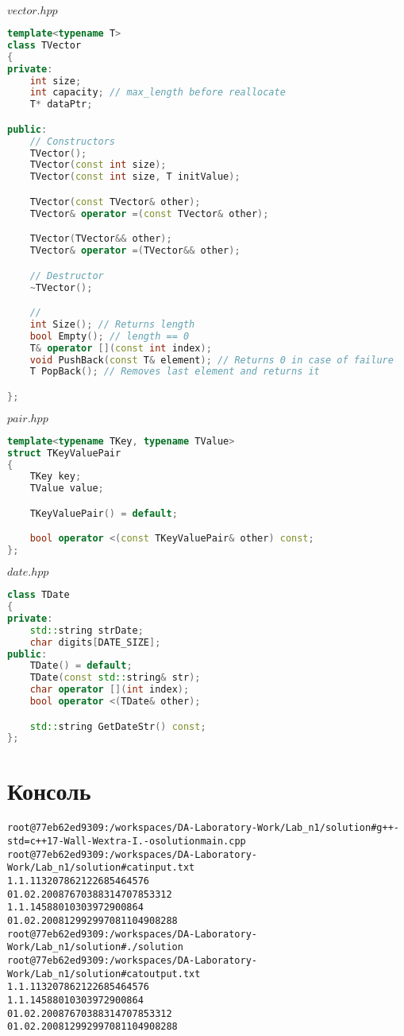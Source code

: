 $vector.hpp$
\begin{lstlisting}[language=c++]
template<typename T>
class TVector
{
private:
	int size;
	int capacity; // max_length before reallocate
	T* dataPtr;

public:
	// Constructors
	TVector();
	TVector(const int size);
	TVector(const int size, T initValue);

	TVector(const TVector& other);
	TVector& operator =(const TVector& other);

	TVector(TVector&& other);
	TVector& operator =(TVector&& other);

	// Destructor
	~TVector();

	// 
	int Size(); // Returns length
	bool Empty(); // length == 0
	T& operator [](const int index);
	void PushBack(const T& element); // Returns 0 in case of failure
	T PopBack(); // Removes last element and returns it

};
\end{lstlisting}

$pair.hpp$
\begin{lstlisting}[language=c++]
template<typename TKey, typename TValue>
struct TKeyValuePair
{
	TKey key;
	TValue value;

	TKeyValuePair() = default;

	bool operator <(const TKeyValuePair& other) const;
};
\end{lstlisting}

$date.hpp$
\begin{lstlisting}[language=c++]
class TDate
{
private:
	std::string strDate;
	char digits[DATE_SIZE];
public:
	TDate() = default;
	TDate(const std::string& str);
	char operator [](int index);
	bool operator <(TDate& other);

	std::string GetDateStr() const;
};
\end{lstlisting}

\pagebreak

\section{Консоль}
\begin{alltt}
root@77eb62ed9309:/workspaces/DA-Laboratory-Work/Lab_n1/solution# g++ -std=c++17 -Wall -Wextra -I. -o solution main.cpp
root@77eb62ed9309:/workspaces/DA-Laboratory-Work/Lab_n1/solution# cat input.txt
1.1.1   13207862122685464576
01.02.2008      7670388314707853312
1.1.1   4588010303972900864
01.02.2008      12992997081104908288
root@77eb62ed9309:/workspaces/DA-Laboratory-Work/Lab_n1/solution# ./solution 
root@77eb62ed9309:/workspaces/DA-Laboratory-Work/Lab_n1/solution# cat output.txt 
1.1.1   13207862122685464576
1.1.1   4588010303972900864
01.02.2008      7670388314707853312
01.02.2008      12992997081104908288
\end{alltt}
\pagebreak

